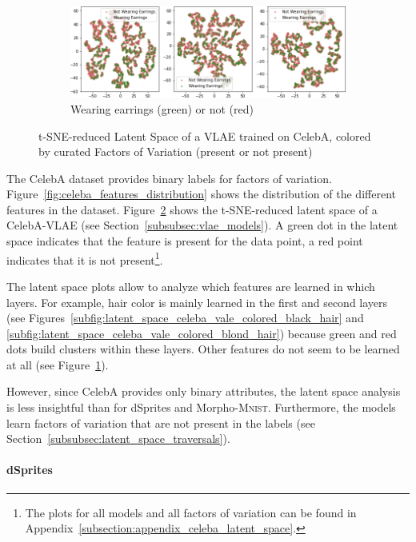 \begin{figure}
\begin{subfigure}{.49\textwidth}
        \includegraphics[width=\textwidth]{images/latent_spaces/celeba/vlae/vlae_celeba_Wearing_Earrings.png}
        \caption{Wearing earrings (green) or not (red)}
        \label{subfig:latent_space_celeba_vale_colored_wearing_earrings}
    \end{subfigure}
    \caption[VLAE Latent Space for CelebA, Curated Features]{\ac{t-SNE}-reduced Latent Space of a \ac{VLAE} trained on CelebA, colored by curated Factors of Variation (present or not present)}
    \label{fig:latent_space_celeba_vale_colored}
\end{figure}

The CelebA dataset provides binary labels for factors of variation.
Figure~\ref{fig:celeba_features_distribution} shows the distribution of the different features in the dataset.
Figure~\ref{fig:latent_space_celeba_vale_colored} shows the \ac{t-SNE}-reduced latent space of a CelebA-\ac{VLAE} (see Section~\ref{subsubsec:vlae_models}).
A green dot in the latent space indicates that the feature is present for the data point, a red point indicates that it is not present\footnote{The plots for all models and all factors of variation can be found in Appendix~\ref{subsection:appendix_celeba_latent_space}.}.

The latent space plots allow to analyze which features are learned in which layers.
For example, hair color is mainly learned in the first and second layers (see Figures~\ref{subfig:latent_space_celeba_vale_colored_black_hair} and \ref{subfig:latent_space_celeba_vale_colored_blond_hair}) because green and red dots build clusters within these layers.
Other features do not seem to be learned at all (see Figure~\ref{subfig:latent_space_celeba_vale_colored_wearing_earrings}).

However, since CelebA provides only binary attributes, the latent space analysis is less insightful than for dSprites and Morpho-\textsc{Mnist}.
Furthermore, the models learn factors of variation that are not present in the labels (see Section~\ref{subsubsec:latent_space_traversals}).

\paragraph{dSprites}

